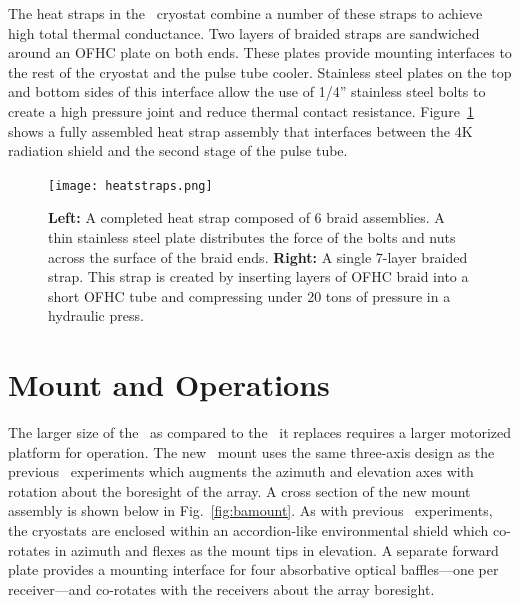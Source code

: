 \documentclass[]{spie}
\begin{document}
The heat straps in the \biceparray\ cryostat combine a number of these straps
to achieve high total thermal conductance. Two layers of braided straps are
sandwiched around an OFHC plate on both ends. These plates provide mounting
interfaces to the rest of the cryostat and the pulse tube cooler. Stainless
steel plates on the top and bottom sides of this interface allow the use of
1/4'' stainless steel bolts to create a high pressure joint and reduce thermal
contact resistance. Figure~\ref{fig:heatstrap} shows a fully assembled heat
strap assembly that interfaces between the 4K radiation shield and the second
stage of the pulse tube.



\begin{figure}[t]
\center
\texttt{[image: heatstraps.png]}
\caption{\textbf{Left:} A completed heat strap composed of 6 braid assemblies. A
thin stainless steel plate distributes the force of the bolts and nuts across the surface
of the braid ends. \textbf{Right:} A single 7-layer braided strap. This strap
is created by inserting layers of OFHC braid into a short OFHC tube and
compressing under 20 tons of pressure in a hydraulic press.}
\label{fig:heatstrap}
\end{figure}


\section{Mount and Operations}

The larger size of the \biceparray\ as compared to the \keckarray\ it replaces
requires a larger motorized platform for operation. The new \biceparray\ mount uses the same three-axis design as the previous
\bk\ experiments which augments the azimuth and elevation axes with
rotation about the boresight of the array. A
cross section of the new mount assembly is shown below in Fig.~\ref{fig:bamount}.
As with previous \bk\ experiments, the cryostats
are enclosed within an accordion-like environmental shield which co-rotates in
azimuth and flexes as the mount tips in elevation. A separate forward
plate provides a mounting interface for four absorbative optical baffles---one per
receiver---and co-rotates with the receivers about the array boresight.
\end{document}
